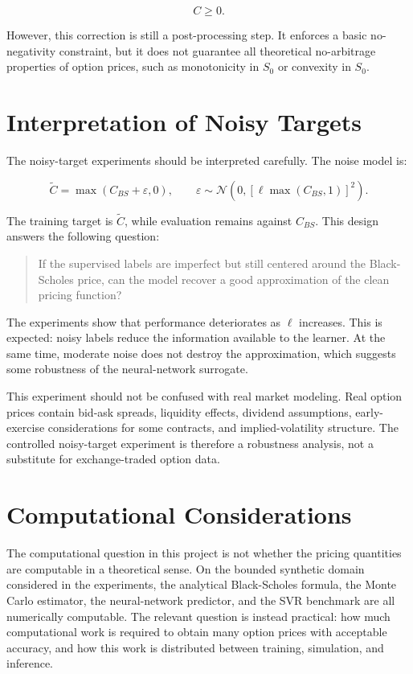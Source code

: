 \begin{equation}
    C \geq 0.
\end{equation}

However, this correction is still a post-processing step.
It enforces a basic no-negativity constraint, but it does not guarantee all theoretical no-arbitrage properties of option prices, such as monotonicity in $S_0$ or convexity in $S_0$.

\section{Interpretation of Noisy Targets}

The noisy-target experiments should be interpreted carefully.
The noise model is:

\begin{equation}
    \tilde{C}
    =
    \max(C_{BS}+\varepsilon,0),
    \qquad
    \varepsilon
    \sim
    \mathcal{N}\left(0,\left[\ell \max(C_{BS},1)\right]^2\right).
\end{equation}

The training target is $\tilde{C}$, while evaluation remains against $C_{BS}$.
This design answers the following question:

\begin{quote}
    If the supervised labels are imperfect but still centered around the Black-Scholes price, can the model recover a good approximation of the clean pricing function?
\end{quote}

The experiments show that performance deteriorates as $\ell$ increases.
This is expected: noisy labels reduce the information available to the learner.
At the same time, moderate noise does not destroy the approximation, which suggests some robustness of the neural-network surrogate.

This experiment should not be confused with real market modeling.
Real option prices contain bid-ask spreads, liquidity effects, dividend assumptions, early-exercise considerations for some contracts, and implied-volatility structure.
The controlled noisy-target experiment is therefore a robustness analysis, not a substitute for exchange-traded option data.

\section{Computational Considerations}

The computational question in this project is not whether the pricing quantities are computable in a theoretical sense.
On the bounded synthetic domain considered in the experiments, the analytical Black-Scholes formula, the Monte Carlo estimator, the neural-network predictor, and the SVR benchmark are all numerically computable.
The relevant question is instead practical: how much computational work is required to obtain many option prices with acceptable accuracy, and how this work is distributed between training, simulation, and inference.

